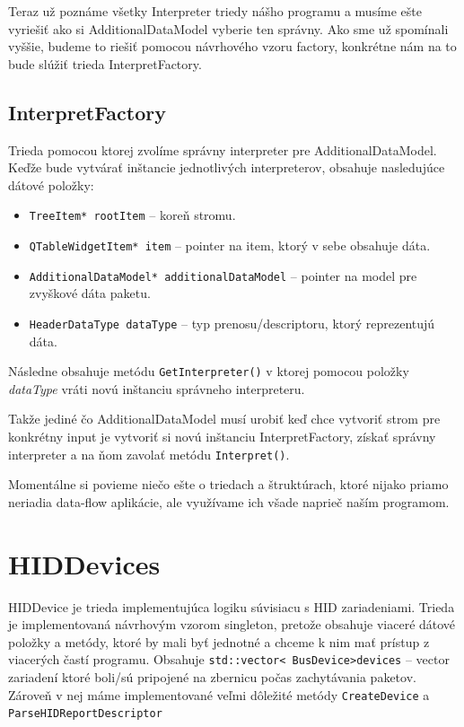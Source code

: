 Teraz už poznáme všetky Interpreter triedy nášho programu a musíme ešte vyriešiť ako si AdditionalDataModel vyberie ten správny. Ako sme už spomínali vyššie, budeme to riešiť pomocou návrhového vzoru factory, konkrétne nám na to bude slúžiť trieda InterpretFactory.

\subsection{InterpretFactory}
Trieda pomocou ktorej zvolíme správny interpreter pre AdditionalDataModel. Keďže bude vytvárať inštancie jednotlivých interpreterov, obsahuje nasledujúce dátové položky:
\begin{itemize}
\item \texttt{TreeItem* rootItem} -- koreň stromu.
\item \texttt{QTableWidgetItem* item} -- pointer na item, ktorý v sebe obsahuje dáta.
\item \texttt{AdditionalDataModel* additionalDataModel} -- pointer na model \newline pre zvyškové dáta paketu.
\item \texttt{HeaderDataType dataType} -- typ prenosu/descriptoru, ktorý reprezentujú dáta.
\end{itemize}
Následne obsahuje metódu \texttt{GetInterpreter()} v ktorej pomocou položky \textit{dataType} vráti novú inštanciu správneho interpreteru. 

Takže jediné čo AdditionalDataModel musí urobiť keď chce vytvoriť strom pre konkrétny input je vytvoriť si novú inštanciu InterpretFactory, získať správny interpreter a na ňom zavolať metódu \texttt{Interpret()}.

Momentálne si povieme niečo ešte o triedach a štruktúrach, ktoré nijako priamo neriadia data-flow aplikácie, ale využívame ich všade naprieč naším programom.

\section{HIDDevices}
HIDDevice je trieda implementujúca logiku súvisiacu s HID zariadeniami. Trieda je implementovaná návrhovým vzorom singleton, pretože obsahuje viaceré dátové položky a metódy, ktoré by mali byť jednotné a chceme k nim mať prístup z viacerých častí programu. Obsahuje \texttt{std::vector\textless~BusDevice\textgreater devices} -- vector zariadení ktoré boli/sú pripojené na zbernicu počas zachytávania paketov. Zároveň v nej máme implementované veľmi dôležité metódy	 \texttt{CreateDevice} a \texttt{ParseHIDReportDescriptor}

